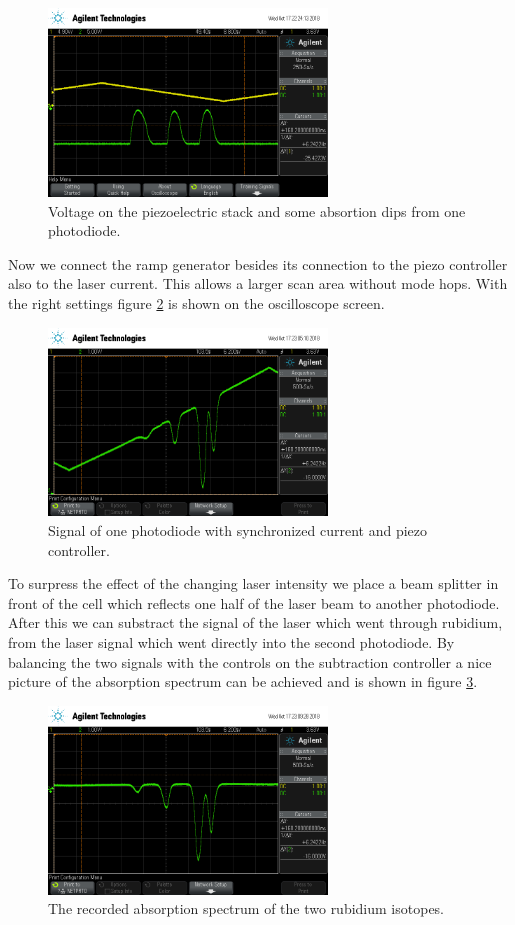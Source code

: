 \begin{figure}
  \centering
  \includegraphics[height = 5cm]{pics/scope_199.png}
  \caption{Voltage on the piezoelectric stack and some absortion dips from one photodiode.}
  \label{fig:triangle_with_absorption}
\end{figure}

Now we connect the ramp generator besides its connection to the piezo controller also to the laser current. This allows a larger scan area without mode hops. With the right settings figure \ref{fig:dreieck_mit_absorption} is shown on the oscilloscope screen.
\begin{figure}
  \centering
  \includegraphics[height = 5cm]{pics/dreieck_mit_absorption.png}
  \caption{Signal of one photodiode with synchronized current and piezo controller.}
  \label{fig:dreieck_mit_absorption}
\end{figure}
To surpress the effect of the changing laser intensity we place a beam splitter in front of the cell which reflects one half of the laser beam to another photodiode. After this we can substract the signal of the laser which went through rubidium, from the laser signal which went directly into the second photodiode. By balancing the two signals with the controls on the subtraction controller a nice picture of the absorption spectrum can be achieved and is shown in figure \ref{fig:perfect_absorption}.
\begin{figure}
  \centering
  \includegraphics[height = 5cm]{pics/perfect_absorption.png}
  \caption{The recorded absorption spectrum of the two rubidium isotopes.}
  \label{fig:perfect_absorption}
\end{figure}

